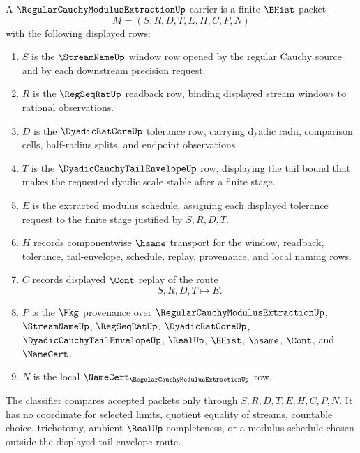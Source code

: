 \begin{definition}
\label{def:regular-cauchy-modulus-extraction-carrier}
A $\RegularCauchyModulusExtractionUp$ carrier is a finite $\BHist$ packet
$$
M=(S,R,D,T,E,H,C,P,N)
$$
with the following displayed rows:
\begin{enumerate}
\item $S$ is the $\StreamNameUp$ window row opened by the regular Cauchy source and by each downstream precision request.
\item $R$ is the $\RegSeqRatUp$ readback row, binding displayed stream windows to rational observations.
\item $D$ is the $\DyadicRatCoreUp$ tolerance row, carrying dyadic radii, comparison cells, half-radius splits, and endpoint observations.
\item $T$ is the $\DyadicCauchyTailEnvelopeUp$ row, displaying the tail bound that makes the requested dyadic scale stable after a finite stage.
\item $E$ is the extracted modulus schedule, assigning each displayed tolerance request to the finite stage justified by $S,R,D,T$.
\item $H$ records componentwise $\hsame$ transport for the window, readback, tolerance, tail-envelope, schedule, replay, provenance, and local naming rows.
\item $C$ records displayed $\Cont$ replay of the route
$$
S,R,D,T \longmapsto E .
$$
\item $P$ is the $\Pkg$ provenance over $\RegularCauchyModulusExtractionUp$, $\StreamNameUp$, $\RegSeqRatUp$, $\DyadicRatCoreUp$, $\DyadicCauchyTailEnvelopeUp$, $\RealUp$, $\BHist$, $\hsame$, $\Cont$, and $\NameCert$.
\item $N$ is the local $\NameCert_{\RegularCauchyModulusExtractionUp}$ row.
\end{enumerate}
The classifier compares accepted packets only through $S,R,D,T,E,H,C,P,N$. It has no coordinate for selected limits, quotient equality of streams, countable choice, trichotomy, ambient $\RealUp$ completeness, or a modulus schedule chosen outside the displayed tail-envelope route.
\end{definition}

